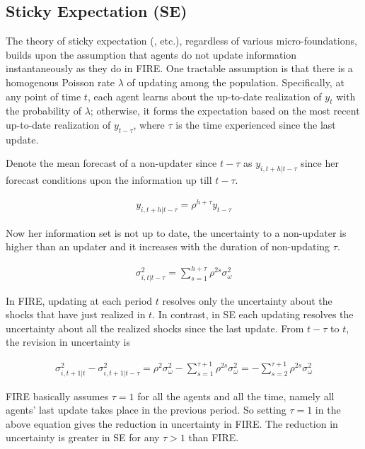 \documentclass[12pt]{article}
\begin{document}
	\subsection{Sticky Expectation (SE)}
	
	The theory of sticky expectation (\citet{mankiw2002sticky}, \citet{carroll2003macroeconomic} etc.), regardless of various micro-foundations, builds upon the assumption that agents do not update information instantaneously as they do in FIRE. One tractable assumption is that there is a homogenous Poisson rate $\lambda$ of updating among the population. Specifically, at any point of time $t$, each agent learns about the up-to-date realization of $y_t$ with the probability of $\lambda$; otherwise, it forms the expectation based on the most recent up-to-date realization of $y_{t-\tau}$, where $\tau$ is the time experienced since the last update. 
	
	Denote the mean forecast of a non-updater since $t-\tau$ as $y_{i,t+h|t-\tau}$ since her forecast conditions upon the information up till $t-\tau$. 
	
	\begin{eqnarray} 
		y_{i,t+h|t-\tau} = \rho^{h+\tau} y_{t-\tau}
	\end{eqnarray}
	
	Now her information set is not up to date, the uncertainty to a non-updater is higher than an updater and it increases with the duration of non-updating $\tau$. 
	
	\begin{eqnarray}\label{VarSEInd}
		\sigma^2_{i,t|t-\tau}= \sum^{h+\tau}_{s=1}\rho^{2s} \sigma^2_{\omega}
	\end{eqnarray}	
	
	In FIRE, updating at each period $t$ resolves only the uncertainty about the shocks that have just realized in $t$. In contrast, in SE each updating resolves the uncertainty about all the realized shocks since the last update. From $t-\tau$ to $t$, the revision in uncertainty is 
	
	\begin{eqnarray}
		\sigma^2_{i,t+1|t} - \sigma^2_{i,t+1|t-\tau} = \rho^{2} \sigma^2_{\omega} - \sum^{\tau+1}_{s=1}\rho^{2s} \sigma^2_{\omega} = -\sum^{\tau+1}_{s=2} \rho^{2s}\sigma^2_{\omega}
	\end{eqnarray}
	
	FIRE basically assumes  $\tau=1$ for all the agents and all the time, namely all agents' last update takes place in the previous period. So setting $\tau =1$ in the above equation gives the reduction in uncertainty in FIRE. The reduction in uncertainty is greater in SE for any $\tau>1$ than FIRE.
	
\end{document}
